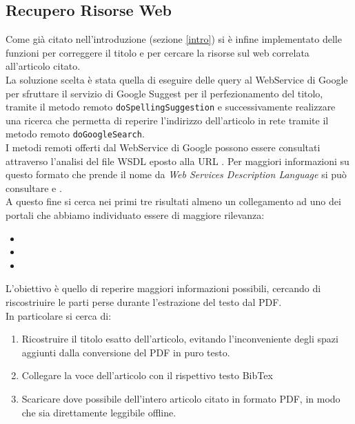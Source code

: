 \subsection{Recupero Risorse Web}

Come già citato nell'introduzione (sezione \ref{intro}) si è infine implementato delle funzioni per correggere il titolo e per cercare la risorse sul web correlata all'articolo citato.\\
La soluzione scelta è stata quella di eseguire delle query al WebService di Google per sfruttare il servizio di Google Suggest per il perfezionamento del titolo, tramite il metodo remoto \texttt{doSpellingSuggestion} e successivamente realizzare una ricerca che permetta di reperire l'indirizzo dell'articolo in rete tramite il metodo remoto \texttt{doGoogleSearch}.\\ 
I metodi remoti offerti dal WebService di Google possono essere consultati attraverso l'analisi del file WSDL eposto alla URL \texttt{} . Per maggiori informazioni su questo formato che prende il nome da \textit{Web Services Description Language} si può consultare \cite{wsdl1} e \cite{wsdl2}.\\

A questo fine si cerca nei primi tre risultati almeno un collegamento ad uno dei portali che abbiamo individuato essere di maggiore rilevanza:

\begin{itemize} 
\item {}
\item {}
\item {}
\end{itemize}

L'obiettivo è quello di reperire maggiori informazioni possibili, cercando di riscostriuire le parti perse durante l'estrazione del testo dal PDF.
\\
In particolare si cerca di:

\begin{enumerate}
	\item Ricostruire il titolo esatto dell'articolo, evitando l'inconveniente degli spazi aggiunti dalla conversione del PDF in puro testo.
	\item Collegare la voce dell'articolo con il rispettivo testo BibTex
	\item Scaricare dove possibile dell'intero articolo citato in formato PDF, in modo che sia direttamente leggibile offline.
\end{enumerate}

